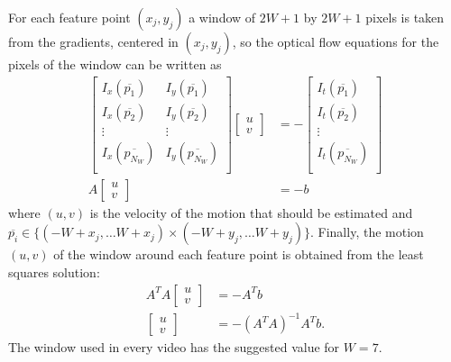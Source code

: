 \documentclass[a4paper,oneside]{article}
\renewcommand{\vec}[1]{\overline{#1}}
\begin{document}
For each feature point $(x_j, y_j)$ a window of $2W+1$ by $2W+1$
pixels is taken from the gradients, centered in $(x_j, y_j)$, so the
optical flow equations for the pixels of the window can be written as
\begin{align}
  \begin{bmatrix}
    I_x(\vec{p_1}) & I_y(\vec{p_1}) \\
    I_x(\vec{p_2}) & I_y(\vec{p_2}) \\
    \vdots & \vdots \\
    I_x(\vec{p_{N_W}}) & I_y(\vec{p_{N_W}}) \\
  \end{bmatrix}
  \begin{bmatrix}
    u \\ v
  \end{bmatrix}
  &= - \begin{bmatrix}
    I_t(\vec{p_1}) \\
    I_t(\vec{p_2}) \\
    \vdots \\
    I_t(\vec{p_{N_W}}) \\
  \end{bmatrix} \\
  A \begin{bmatrix} u \\ v \end{bmatrix} &= - b
\end{align}
where $(u,v)$ is the velocity of the motion that should be estimated
and $\vec{p_i} \in \{ (-W + x_j,\dots W + x_j) \times (-W + y_j,\dots
W + y_j)\}$.  Finally, the motion $(u,v)$ of the window around each
feature point is obtained from the least squares solution:
\begin{align}
  A^TA \begin{bmatrix} u \\ v \end{bmatrix} &= -A^Tb \\
  \begin{bmatrix} u \\ v \end{bmatrix} &= -\left(A^TA\right)^{-1}A^Tb .
\end{align}
The window used in every video has the suggested value for $W=7$.
\end{document}
